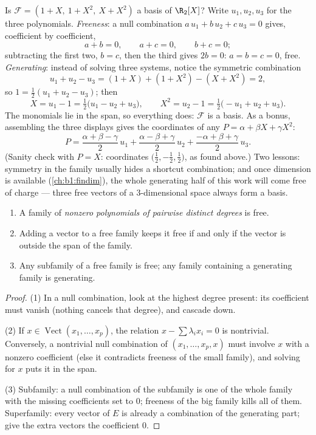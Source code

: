 \begin{example}
\label{ex:b1:vspaces:testbasis}
Is $\mathcal{F} = (1 + X,\ 1 + X^2,\ X + X^2)$ a basis of
$\R_2[X]$? Write $u_1, u_2, u_3$ for the three polynomials.
\emph{Freeness}: a null combination $a\,u_1 + b\,u_2 + c\,u_3 =
0$ gives, coefficient by coefficient,
\[
a + b = 0, \qquad a + c = 0, \qquad b + c = 0 ;
\]
subtracting the first two, $b = c$, then the third gives $2b =
0$: $a = b = c = 0$, free. \emph{Generating}: instead of solving
three systems, notice the symmetric combination
\[
u_1 + u_2 - u_3 = (1 + X) + (1 + X^2) - (X + X^2) = 2 ,
\]
so $1 = \frac12(u_1 + u_2 - u_3)$; then
\[
X = u_1 - 1 = \tfrac12\bigl(u_1 - u_2 + u_3\bigr),
\qquad
X^2 = u_2 - 1 = \tfrac12\bigl(-u_1 + u_2 + u_3\bigr).
\]
The monomials lie in the span, so everything does: $\mathcal{F}$
is a basis. As a bonus, assembling the three displays gives the
coordinates of any $P = \alpha + \beta X + \gamma X^2$:
\[
P = \frac{\alpha + \beta - \gamma}{2}\,u_1
+ \frac{\alpha - \beta + \gamma}{2}\,u_2
+ \frac{-\alpha + \beta + \gamma}{2}\,u_3 .
\]
(Sanity check with $P = X$: coordinates $\bigl(\frac12,
-\frac12, \frac12\bigr)$, as found above.) Two lessons: symmetry
in the family usually hides a shortcut combination; and once
dimension is available (\cref{ch:b1:findim}), the whole
generating half of this work will come free of charge --- three
free vectors of a $3$-dimensional space always form a basis.
\end{example}

\begin{proposition}\label{prop:b1:vspaces:freecriteria}
\begin{enumerate}
  \item A family of \emph{nonzero polynomials of pairwise distinct
        degrees} is free.
  \item Adding a vector to a free family keeps it free if and only
        if the vector is outside the span of the family.
  \item Any subfamily of a free family is free; any family
        containing a generating family is generating.
\end{enumerate}
\end{proposition}

\begin{proof}
(1) In a null combination, look at the highest degree present: its
coefficient must vanish (nothing cancels that degree), and cascade
down.

(2) If $x \in \operatorname{Vect}(x_1, \dots, x_p)$, the relation $x
- \sum\lambda_i x_i = 0$ is nontrivial. Conversely, a nontrivial
null combination of $(x_1, \dots, x_p, x)$ must involve $x$ with a
nonzero coefficient (else it contradicts freeness of the small
family), and solving for $x$ puts it in the span.

(3) Subfamily: a null combination of the subfamily is one of the
whole family with the missing coefficients set to $0$; freeness
of the big family kills all of them. Superfamily: every vector
of $E$ is already a combination of the generating part; give the
extra vectors the coefficient $0$.
\end{proof}

